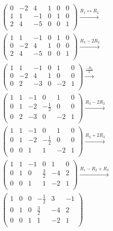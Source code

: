 \documentclass[12pt,titlepage]{extarticle}
\begin{document}
\begin{align*}
    & \left(\begin{array}{cccccc}0&-2&4&1&0&0\\1&1&-1&0&1&0\\2&4&-5&0&0&1\\\end{array}\right) \xrightarrow{R_1 \leftrightarrow R_2} \\
    & \left(\begin{array}{cccccc}1&1&-1&0&1&0\\0&-2&4&1&0&0\\2&4&-5&0&0&1\\\end{array}\right) \xrightarrow{R_3 - 2 R_2} \\
    & \left(\begin{array}{cccccc}1&1&-1&0&1&0\\0&-2&4&1&0&0\\0&2&-3&0&-2&1\\\end{array}\right) \xrightarrow{\frac{-R_2}{2}} \\
    & \left(\begin{array}{cccccc}1&1&-1&0&1&0\\0&1&-2&-\frac{1}{2}&0&0\\0&2&-3&0&-2&1\\\end{array}\right) \xrightarrow{R_3 - 2 R_2} \\
    & \left(\begin{array}{cccccc}1&1&-1&0&1&0\\0&1&-2&-\frac{1}{2}&0&0\\0&0&1&1&-2&1\\\end{array}\right) \xrightarrow{R_2 + 2 R_3} \\
    & \left(\begin{array}{cccccc}1&1&-1&0&1&0\\0&1&0&\frac{3}{2}&-4&2\\0&0&1&1&-2&1\\\end{array}\right) \xrightarrow{R_1 - R_2 + R_3} \\
    & \left(\begin{array}{cccccc}1&0&0&-\frac{1}{2}&3&-1\\0&1&0&\frac{3}{2}&-4&2\\0&0&1&1&-2&1\\\end{array}\right)
\end{align*}
\end{document}
